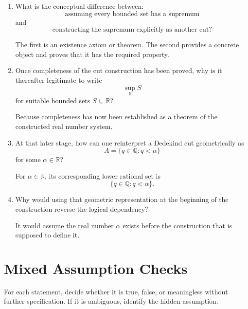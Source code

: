 \documentclass{essay}
\begin{document}
\begin{enumerate}[label=\arabic*., itemsep=10pt]
\item What is the conceptual difference between:
\[
\text{assuming every bounded set has a supremum}
\]
and
\[
\text{constructing the supremum explicitly as another cut}?
\]

\begin{answer}
The first is an existence axiom or theorem. The second provides a concrete object and proves that it has the required property.
\end{answer}

\item Once completeness of the cut construction has been proved, why is it thereafter legitimate to write
\[
\sup_{\mathbb{R}} S
\]
for suitable bounded sets $S\subseteq\mathbb{R}$?

\begin{answer}
Because completeness has now been established as a theorem of the constructed real number system.
\end{answer}

\item At that later stage, how can one reinterpret a Dedekind cut geometrically as
\[
A=\{q\in\mathbb{Q}:q<\alpha\}
\]
for some $\alpha\in\mathbb{R}$?

\begin{answer}
For $\alpha\in\mathbb{R}$, its corresponding lower rational set is
\[
\{q\in\mathbb{Q}:q<\alpha\}.
\]
\end{answer}

\item Why would using that geometric representation at the beginning of the construction reverse the logical dependency?

\begin{answer}
It would assume the real number $\alpha$ exists before the construction that is supposed to define it.
\end{answer}

\end{enumerate}

\section{Mixed Assumption Checks}

For each statement, decide whether it is true, false, or meaningless without further specification.
If it is ambiguous, identify the hidden assumption.
\end{document}

